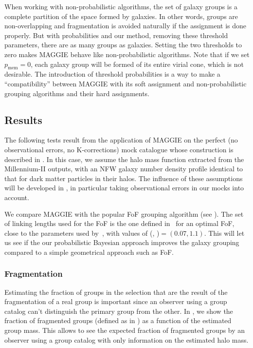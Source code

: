 When working with non-probabilistic algorithms, the set of galaxy groups is a
complete partition of the space formed by galaxies. In other words, groups are
non-overlapping and fragmentation is avoided naturally if the assignment is
done properly. But with probabilities and our method, removing these threshold
parameters, there are as many groups as galaxies. Setting the two thresholds to
zero makes MAGGIE behave like non-probabilistic algorithms. Note that if we set
$p_\mathrm{mem}=0$, each galaxy group will be formed of its entire virial cone,
which is not desirable. The introduction of threshold probabilities is a way to
make a ``compatibility'' between MAGGIE with its soft assignment and
non-probabilistic grouping algorithms and their hard assignments.

\subsection{Results}

The following tests result from the application of MAGGIE on the perfect (no
observational errors, no K-corrections) mock catalogue whose construction is
described in . In this case, we assume the halo mass
function extracted from the Millennium-II outputs, with an NFW galaxy number
density profile identical to that for dark matter particles in their halos. The
influence of these assumptions will be developed in
, in particular taking observational errors
in our mocks into account.

We compare MAGGIE with the popular FoF grouping algorithm (see
). The set of linking lengths used
for the FoF is the one defined in~\cite{Duarte+14} for an optimal FoF, close to
the parameters used by~\cite{Robotham+11}, with values of (\bperp,
\bpar)$=(0.07, 1.1)$. This will let us see if the our probabilistic Bayesian
approach improves the galaxy grouping compared to a simple geometrical approach
such as FoF.

\subsubsection{Fragmentation}

Estimating the fraction of groups in the selection that are the result of the
fragmentation of a real group is important since an observer using a group
catalog can't distinguish the primary group from the other. In
, we show the fraction of fragmented groups (defined
as in ) as a function of the
estimated group mass. This allows to see the expected fraction of fragmented
groups by an observer using a group catalog with only information on the
estimated halo mass.

